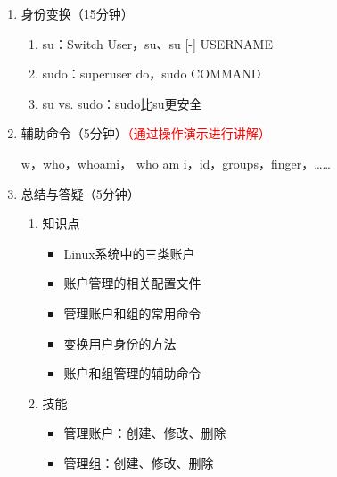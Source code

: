 \documentclass{TIJMUjiaoanLL}
\begin{document}
\begin{enumerate}
  \item 身份变换（15分钟）
    \begin{enumerate}
      \item su：Switch User，su、su [-] USERNAME
      \item sudo：superuser do，sudo COMMAND
      \item su vs. sudo：sudo比su更安全
    \end{enumerate}

  \item 辅助命令（5分钟）\textcolor{red}{（通过操作演示进行讲解）}

    w，who，whoami， who am i，id，groups，finger，……

  \item 总结与答疑（5分钟）
    \begin{enumerate}
      \item 知识点
	\begin{itemize}
	  \item Linux系统中的三类账户
	  \item 账户管理的相关配置文件
	  \item 管理账户和组的常用命令
	  \item 变换用户身份的方法
	  \item 账户和组管理的辅助命令
	\end{itemize}
      \item 技能
	\begin{itemize}
	  \item 管理账户：创建、修改、删除
	  \item 管理组：创建、修改、删除
	\end{itemize}
    \end{enumerate}

\end{enumerate}

\otherTail
\end{document}
